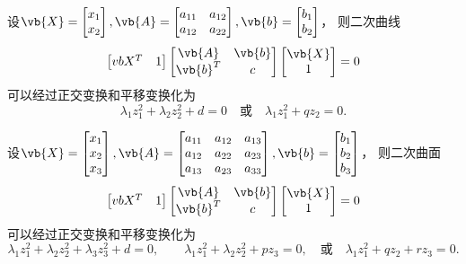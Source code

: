 \begin{theorem}[平面二次曲线的分类定理]
设\(\vb{X} = \begin{bmatrix}
	x_1 \\ x_2
\end{bmatrix},
\vb{A} = \begin{bmatrix}
	a_{11} & a_{12} \\
	a_{12} & a_{22}
\end{bmatrix},
\vb{b} = \begin{bmatrix}
	b_1 \\ b_2
\end{bmatrix}\)，
则二次曲线\[
	\begin{bmatrix}
		vb{X}^T & 1
	\end{bmatrix}
	\begin{bmatrix}
		\vb{A} & \vb{b} \\
		\vb{b}^T & c
	\end{bmatrix}
	\begin{bmatrix}
		\vb{X} \\ 1
	\end{bmatrix}
	= 0
\]可以经过正交变换和平移变换化为\[
	\lambda_1 z_1^2 + \lambda_2 z_2^2 + d = 0
	\quad\text{或}\quad
	\lambda_1 z_1^2 + q z_2 = 0.
\]
\end{theorem}

\begin{theorem}[空间二次曲面的分类定理]
设\(\vb{X} = \begin{bmatrix}
	x_1 \\ x_2 \\ x_3
\end{bmatrix},
\vb{A} = \begin{bmatrix}
	a_{11} & a_{12} & a_{13} \\
	a_{12} & a_{22} & a_{23} \\
	a_{13} & a_{23} & a_{33}
\end{bmatrix},
\vb{b} = \begin{bmatrix}
	b_1 \\ b_2 \\ b_3
\end{bmatrix}\)，
则二次曲面\[
	\begin{bmatrix}
		vb{X}^T & 1
	\end{bmatrix}
	\begin{bmatrix}
		\vb{A} & \vb{b} \\
		\vb{b}^T & c
	\end{bmatrix}
	\begin{bmatrix}
		\vb{X} \\ 1
	\end{bmatrix}
	= 0
\]可以经过正交变换和平移变换化为\[
	\lambda_1 z_1^2 + \lambda_2 z_2^2 + \lambda_3 z_3^2 + d = 0,
	\qquad
	\lambda_1 z_1^2 + \lambda_2 z_2^2 + p z_3 = 0,
	\quad\text{或}\quad
	\lambda_1 z_1^2 + q z_2 + r z_3 = 0.
\]
\end{theorem}

